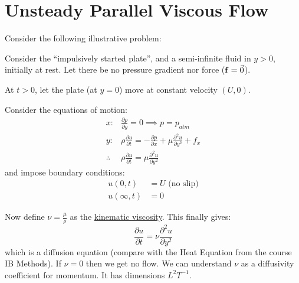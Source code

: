 \documentclass[../Main.tex]{subfiles}
\begin{document}
\section{Unsteady Parallel Viscous Flow}
Consider the following illustrative problem:
\begin{example}
    Consider the ``impulsively started plate'', and a semi-infinite fluid in $y > 0$, initially at rest. Let there be no pressure gradient nor force ($\mathbf{f} = \vec0$).

    At $t > 0$, let the plate (at $y = 0$) move at constant velocity $(U, 0)$.

    Consider the equations of motion:
    \begin{align*}
        x:& \frac{\partial p}{\partial y} = 0 \implies p = p_{atm} \\
        y:& \rho \frac{\partial u}{\partial t} = - \frac{\partial p}{\partial x} + \mu \frac{\partial^{2}u}{\partial y^{2}} + f_x\\
        \therefore& \rho \frac{\partial u}{\partial t} = \mu \frac{\partial^{2}u}{\partial y^{2}} 
    \end{align*}
    and impose boundary conditions:
    \begin{align*}
        u(0, t) &= U \text{ (no slip)} \\
        u(\infty, t) &= 0
    \end{align*}

    Now define $\nu = \frac{\mu}{\rho}$ as the \underline{kinematic viscosity}. This finally gives:
    \begin{equation}
        \frac{\partial u}{\partial t} = \nu \frac{\partial^{2}u}{\partial y^{2}}
        \label{eqnFluidDiffusion}
    \end{equation}
    which is a diffusion equation (compare with the Heat Equation from the course IB Methods). If $\nu = 0$ then we get no flow. We can understand $\nu$ as a diffusivity coefficient for momentum. It has dimensions $L^2 T^{-1}$.


\end{example}
\end{document}

